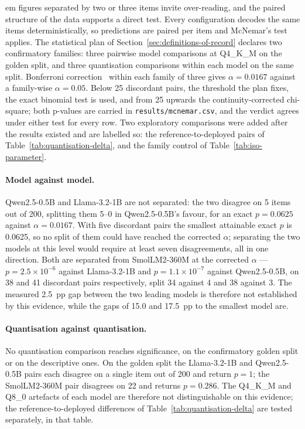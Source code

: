 \Gls{em} figures separated by two or three items invite over-reading, and the paired structure
of the data supports a direct test. Every configuration decodes the same items deterministically,
so predictions are paired per item and McNemar's test~\cite{mcnemar1947} applies. The statistical
plan of Section~\ref{sec:definitions-of-record} declares two confirmatory families: three pairwise
model comparisons at Q4\_K\_M on the golden split, and three quantisation comparisons within each
model on the same split. Bonferroni correction~\cite{dunn1961} within each family of three gives
$\alpha = 0.0167$ against a family-wise $\alpha = 0.05$. Below 25 discordant pairs, the threshold
the plan fixes, the exact binomial test is used, and from 25 upwards the continuity-corrected
chi-square; both p-values are carried in \texttt{results/mcnemar.csv}, and the verdict agrees under
either test for every row. Two exploratory comparisons were added after the results existed and are
labelled so: the reference-to-deployed pairs of Table~\ref{tab:quantisation-delta}, and the family
control of Table~\ref{tab:iso-parameter}.

\paragraph{Model against model.} Qwen2.5-0.5B and Llama-3.2-1B are not separated: the two disagree
on 5 items out of 200, splitting them 5--0 in Qwen2.5-0.5B's favour, for an exact $p = 0.0625$
against $\alpha = 0.0167$. With five discordant pairs the smallest attainable exact $p$ is 0.0625,
so no split of them could have reached the corrected $\alpha$; separating the two models at this
level would require at least seven disagreements, all in one direction. Both are separated from
SmolLM2-360M at the corrected $\alpha$ --- $p = 2.5 \times 10^{-6}$ against Llama-3.2-1B and
$p = 1.1 \times 10^{-7}$ against Qwen2.5-0.5B, on 38 and 41 discordant pairs respectively, split 34
against 4 and 38 against 3. The measured 2.5~pp gap between the two leading models is therefore not
established by this evidence, while the gaps of 15.0 and 17.5~pp to the smallest model are.

\paragraph{Quantisation against quantisation.} No quantisation comparison reaches significance,
on the confirmatory golden split or on the descriptive ones. On the golden split the Llama-3.2-1B
and Qwen2.5-0.5B pairs each disagree on a single item out of 200 and return $p = 1$; the
SmolLM2-360M pair disagrees on 22 and returns $p = 0.286$. The Q4\_K\_M and Q8\_0 artefacts of each
model are therefore not distinguishable on this evidence; the reference-to-deployed differences of
Table~\ref{tab:quantisation-delta} are tested separately, in that table.

